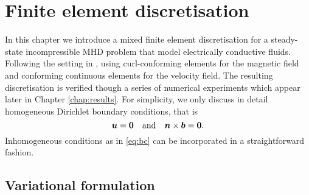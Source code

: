 \chapter{Finite element discretisation}
\label{sec:discretization}

In this chapter we introduce a mixed finite element discretisation for a steady-state incompressible MHD problem that model electrically conductive fluids. Following the setting in \cite{schotzau2004mixed}, using curl-conforming elements for the magnetic field and conforming continuous elements for the velocity field. The resulting discretisation is verified though a series of numerical experiments which appear later in Chapter \ref{chap:results}. For simplicity, we only discuss in detail homogeneous Dirichlet boundary conditions, that is
\begin{equation} \label{eq:homogeneousBC}
    \boldsymbol u = \boldsymbol 0 \quad \mbox{and} \quad \boldsymbol n\times \boldsymbol b = \boldsymbol 0.
\end{equation}
Inhomogeneous conditions as in \eqref{eq:bc} can be incorporated in a straightforward fashion.


\section{Variational formulation}
\label{sec:variation}

